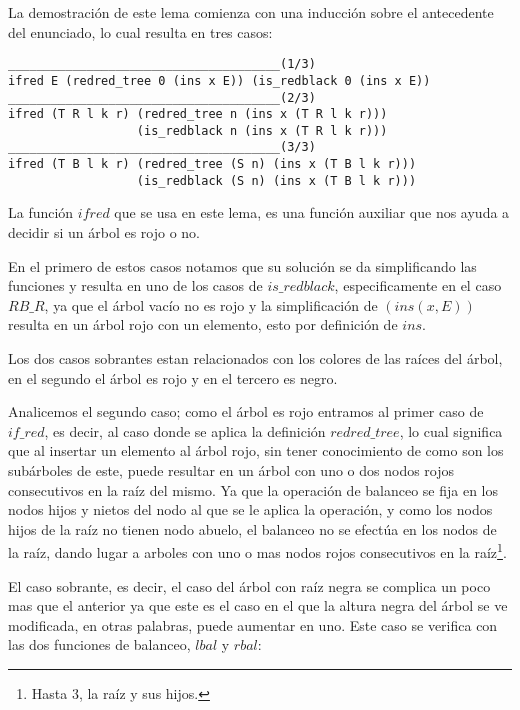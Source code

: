 La demostraci\'on de este lema comienza con una inducci\'on sobre el antecedente del enunciado, lo 
cual resulta en tres casos:

 \begin{verbatim}
______________________________________(1/3)
ifred E (redred_tree 0 (ins x E)) (is_redblack 0 (ins x E))
______________________________________(2/3)
ifred (T R l k r) (redred_tree n (ins x (T R l k r)))
                  (is_redblack n (ins x (T R l k r)))
______________________________________(3/3)
ifred (T B l k r) (redred_tree (S n) (ins x (T B l k r)))
                  (is_redblack (S n) (ins x (T B l k r)))
 \end{verbatim}

La funci\'on $ifred$ que se usa en este lema, es una funci\'on auxiliar que nos ayuda a decidir si
un \'arbol es rojo o no.

En el primero de estos casos notamos que su soluci\'on se da simplificando las funciones y resulta
en uno de los casos de \hyperref[inductive_isRedB]{$is\_redblack$}, especificamente en el caso 
$RB\_R$, ya que el \'arbol vacío no es rojo y la simplificaci\'on de $(ins(x,E))$ resulta en un 
\'arbol rojo con un elemento, esto por definici\'on de \hyperref[func_ins]{$ins$}.

Los dos casos sobrantes estan relacionados con los colores de las ra\'ices del \'arbol, en el
segundo el \'arbol es rojo y en el tercero es negro.

Analicemos el segundo caso; como el \'arbol es rojo entramos al primer caso de $if\_red$, es decir,
al caso donde se aplica la definici\'on \hyperref[inductive_isRedB]{$redred\_tree$}, lo cual 
significa que al insertar un elemento al \'arbol rojo, sin tener conocimiento de como son los 
subárboles de este, puede resultar en un \'arbol con uno o dos nodos rojos consecutivos en la ra\'iz 
del mismo. Ya que la operaci\'on de balanceo se fija en los nodos hijos y nietos del nodo al que se 
le aplica la operaci\'on, y como los nodos hijos de la raíz no tienen nodo abuelo, el balanceo no se 
efectúa en los nodos de la raíz, dando lugar a arboles con uno o mas nodos rojos consecutivos en la 
raíz\footnote{Hasta 3, la raíz y sus hijos.}.

El caso sobrante, es decir, el caso del \'arbol con raíz negra se complica un poco mas que el 
anterior ya que este es el caso en el que la altura negra del \'arbol se ve modificada, en otras 
palabras, puede aumentar en uno. Este caso se verifica con las dos funciones de balanceo, 
\hyperref[func_balanceo]{$lbal$} y \hyperref[func_balanceo]{$rbal$}:

